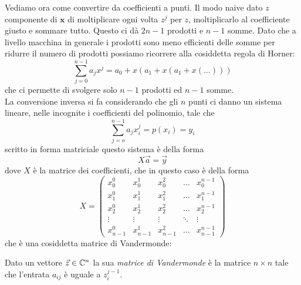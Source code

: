 \documentclass[11pt]{scrartcl}
\begin{document}
	Vediamo ora come convertire da coefficienti a punti. Il modo naive dato $z$ componente di $\mathbf{x}$ di moltiplicare ogni volta $z^j$ per $z$, moltiplicarlo al coefficiente giusto e sommare tutto. Questo ci dà $2n-1$ prodotti e $n-1$ somme. Dato che a livello macchina in generale i prodotti sono meno efficienti delle somme per ridurre il numero di prodotti possiamo ricorrere alla cosiddetta regola di Horner:
	$$\sum_{j=0}^{n-1}a_jx^j=a_0+x\left(a_1+x\left(a_1+x\left(\dots\right)\right)\right)$$  
	che ci permette di svolgere solo $n-1$ prodotti ed $n-1$ somme. \\ 
	La conversione inversa si fa considerando che gli $n$ punti ci danno un sistema lineare, nelle incognite i coefficienti del polinomio, tale che
	$$\sum_{j=o}^{n-1}a_jx_i^j=p(x_i)=y_i$$
	scritto in forma matriciale questo sistema è della forma
	$$X\vec{a}=\vec{y}$$
	dove $X$ è la matrice dei coefficienti, che in questo caso è della forma
	$$X=
	\begin{pmatrix}
		x_0^0 & x_0^1 & x_0^2 & \dots & x_0^{n-1} \\
		x_1^0 & x_1^1 & x_1^2 & \dots & x_1^{n-1} \\ 
		x_2^0 & x_2^1 & x_2^2 & \dots & x_2^{n-1} \\
		\vdots & \vdots & \vdots & \ddots & \vdots \\
		x_{n-1}^0 & x_{n-1}^1 & x_{n-1}^2 & \dots & x_{n-1}^{n-1}
	\end{pmatrix}
	$$
	che è una cosiddetta matrice di Vandermonde:
	\begin{definition}
		Dato un vettore $\vec{z}\in\mathbb C^n$ la sua \textit{matrice di Vandermonde} è la matrice $n\times n$ tale che l'entrata $a_{ij}$ è uguale a  $z_i^{j-1}$.
	\end{definition}
	
\end{document}
